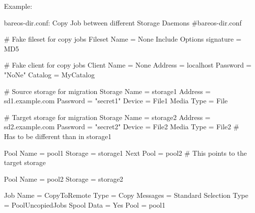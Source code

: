 Example:

\begin{bconfig}{bareos-dir.conf: Copy Job between different Storage Daemons}
#bareos-dir.conf

# Fake fileset for copy jobs
Fileset {
  Name = None
  Include {
    Options {
      signature = MD5
    }
  }
}

# Fake client for copy jobs
Client {
  Name = None
  Address = localhost
  Password = "NoNe"
  Catalog = MyCatalog
}

# Source storage for migration
Storage {
   Name = storage1
   Address = sd1.example.com
   Password = "secret1"
   Device = File1
   Media Type = File
}

# Target storage for migration
Storage {
   Name = storage2
   Address = sd2.example.com
   Password = "secret2"
   Device = File2
   Media Type = File2   # Has to be different than in storage1
}

Pool {
   Name = pool1
   Storage = storage1
   Next Pool = pool2    # This points to the target storage
}

Pool {
   Name = pool2
   Storage = storage2
}

Job {
   Name = CopyToRemote
   Type = Copy
   Messages = Standard
   Selection Type = PoolUncopiedJobs
   Spool Data = Yes
   Pool = pool1
}
\end{bconfig}
